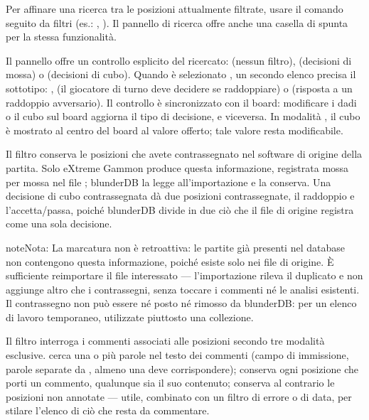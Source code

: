 \documentclass[letterpaper,10pt,italian]{sphinxmanual}
\begin{document}
\sphinxAtStartPar
Per affinare una ricerca tra le posizioni attualmente filtrate, usare il comando  seguito da filtri (es.: , ). Il pannello di ricerca offre anche una casella di spunta  per la stessa funzionalità.

\sphinxAtStartPar
Il pannello offre un controllo esplicito del  ricercato:  (nessun filtro),  (decisioni di mossa) o  (decisioni di cubo). Quando è selezionato , un secondo elenco precisa il sotto\sphinxhyphen{}tipo: ,  (il giocatore di turno deve decidere se raddoppiare) o  (risposta a un raddoppio avversario). Il controllo è sincronizzato con il board: modificare i dadi o il cubo sul board aggiorna il tipo di decisione, e viceversa. In modalità , il cubo è mostrato al centro del board al valore offerto; tale valore resta modificabile.

\sphinxAtStartPar
Il filtro  conserva le posizioni che avete contrassegnato nel software di origine della partita. Solo eXtreme Gammon produce questa informazione, registrata mossa per mossa nel file ; blunderDB la legge all’importazione e la conserva. Una decisione di cubo contrassegnata dà due posizioni contrassegnate, il raddoppio e l’accetta/passa, poiché blunderDB divide in due ciò che il file di origine registra come una sola decisione.

\begin{sphinxadmonition}{note}{Nota:}
\sphinxAtStartPar
La marcatura non è retroattiva: le partite già presenti nel database non contengono questa informazione, poiché esiste solo nei file di origine. È sufficiente reimportare il file  interessato — l’importazione rileva il duplicato e non aggiunge altro che i contrassegni, senza toccare i commenti né le analisi esistenti. Il contrassegno non può essere né posto né rimosso da blunderDB: per un elenco di lavoro temporaneo, utilizzate piuttosto una collezione.
\end{sphinxadmonition}

\sphinxAtStartPar
Il filtro  interroga i commenti associati alle posizioni secondo tre modalità esclusive.  cerca una o più parole nel testo dei commenti (campo di immissione, parole separate da \sphinxcode{\sphinxupquote{;}}, almeno una deve corrispondere);  conserva ogni posizione che porti un commento, qualunque sia il suo contenuto;  conserva al contrario le posizioni non annotate — utile, combinato con un filtro di errore o di data, per stilare l’elenco di ciò che resta da commentare.
\end{document}
